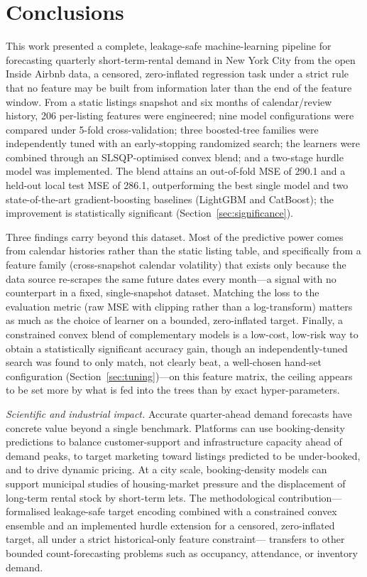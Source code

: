 \documentclass[journal]{IEEEtran}
\begin{document}
\section{Conclusions}
\label{sec:concl}
This work presented a complete, leakage-safe machine-learning pipeline for
forecasting quarterly short-term-rental demand in New York City from the open
Inside Airbnb data, a censored, zero-inflated regression task under a strict
rule that no feature may be built from information later than the end of the
feature window. From a static listings snapshot and six months of
calendar/review history, 206 per-listing features were engineered; nine model
configurations were compared under 5-fold cross-validation; three boosted-tree
families were independently tuned with an early-stopping randomized search;
the learners were combined through an SLSQP-optimised convex blend; and a
two-stage hurdle model was implemented. The blend attains an out-of-fold MSE of
290.1 and a held-out local test MSE of 286.1, outperforming the best single
model and two state-of-the-art gradient-boosting baselines (LightGBM and
CatBoost); the improvement is statistically significant
(Section~\ref{sec:significance}).

Three findings carry beyond this dataset. Most of the predictive power comes
from calendar histories rather than the static listing table, and specifically
from a feature family (cross-snapshot calendar volatility) that exists only
because the data source re-scrapes the same future dates every month---a
signal with no counterpart in a fixed, single-snapshot dataset. Matching the
loss to the evaluation metric (raw MSE with clipping rather than a
log-transform) matters as much as the choice of learner on a bounded,
zero-inflated target. Finally, a constrained convex blend of complementary
models is a low-cost, low-risk way to obtain a statistically significant
accuracy gain, though an independently-tuned search was found to only match,
not clearly beat, a well-chosen hand-set configuration
(Section~\ref{sec:tuning})---on this feature matrix, the ceiling appears to be
set more by what is fed into the trees than by exact hyper-parameters.

\emph{Scientific and industrial impact.} Accurate quarter-ahead demand
forecasts have concrete value beyond a single benchmark. Platforms can use
booking-density predictions to balance customer-support and infrastructure
capacity ahead of demand peaks, to target marketing toward listings predicted to
be under-booked, and to drive dynamic pricing. At a city scale, booking-density
models can support municipal studies of housing-market pressure and the
displacement of long-term rental stock by short-term lets. The methodological
contribution---formalised leakage-safe target encoding combined with a
constrained convex ensemble and an implemented hurdle extension for a censored,
zero-inflated target, all under a strict historical-only feature constraint---
transfers to other bounded count-forecasting problems such as occupancy,
attendance, or inventory demand.
\end{document}
